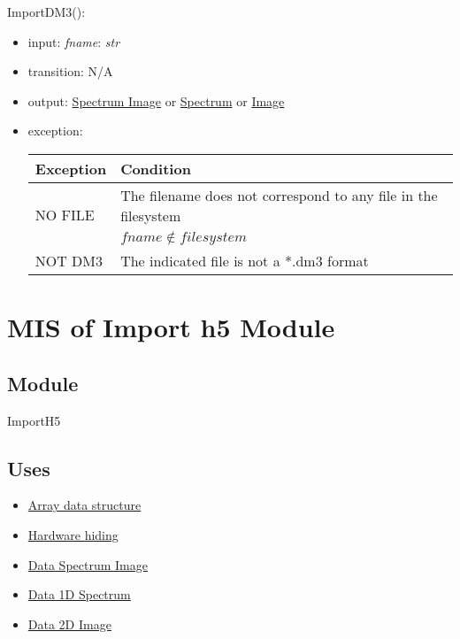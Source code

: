 \documentclass[12pt, titlepage]{article}
\begin{document}
\noindent ImportDM3():
\begin{itemize}
\item input: \textit{fname}: \textit{str}
\item transition: N/A
\item output: \hyperref[Mod:SI]{Spectrum Image} or \hyperref[Mod:Spectrum]{Spectrum} or \hyperref[Mod:Image]{Image}
\item exception: 
\begin{center}
    \begin{tabular}{p{3cm} p{12cm}}
        \toprule[0.15em]
        \textbf{Exception} & \textbf{Condition}\\
        \midrule[0.1em]
        \multirow{2}{0.25\textwidth}{NO FILE} & The filename does not correspond to any file in the filesystem\\ 
        & $fname \notin filesystem$\\ 
        \midrule[0.05em]
        NOT DM3 & The indicated file is not a *.dm3 format\\
        \bottomrule[0.15em]
    \end{tabular}
\end{center}

\end{itemize}

\section{MIS of Import h5 Module} \label{Mod:ImportH5} 

\subsection{Module}
ImportH5

\subsection{Uses}
\begin{itemize}
    \item \hyperref[Mod:Array]{Array data structure}
    \item \hyperref[Mod:HH]{Hardware hiding}
    \item \hyperref[Mod:SI]{Data Spectrum Image}
    \item \hyperref[Mod:Spectrum]{Data 1D Spectrum}
    \item \hyperref[Mod:Image]{Data 2D Image}
\end{itemize}
\end{document}
